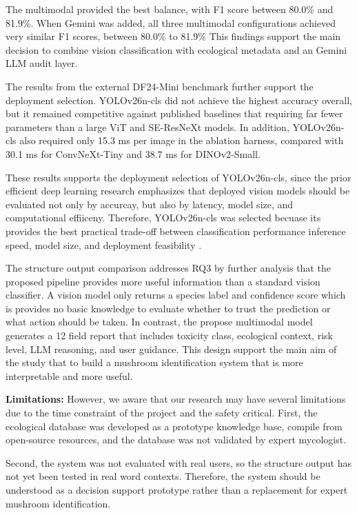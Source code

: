 \documentclass[journal,transmag]{IEEEtran}
\begin{document}
The multimodal provided the best balance, with F1 score between 80.0\% and 81.9\%. When Gemini was added, all three multimodal configurations achieved very similar F1 scores, between 80.0\% to 81.9\%  This findings support the main decision to combine vision classification with ecological metadata and an Gemini LLM audit layer.


The results from the external DF24-Mini benchmark further support the deployment selection. YOLOv26n-cls did not achieve the highest accuracy overall, but it remained competitive against published baselines that requiring far fewer parameters than a large ViT and SE-ResNeXt models. In addition, YOLOv26n-cls also required only 15.3 ms per image in the ablation harness, compared with 30.1 ms for ConvNeXt-Tiny and 38.7 ms for DINOv2-Small. 

These results supports the deployment selection of YOLOv26n-cls, since the prior efficient deep learning research emphasizes that deployed vision models should be evaluated not only by accurcay, but also by latency, model size, and computational effiiceny.  Therefore,  YOLOv26n-cls was selected becuase its provides the best practical trade-off between classification performance inference speed, model size, and deployment feasibility \cite{howard2017mobilenets}. 

The structure output comparison addresses RQ3 by further analysis that the proposed pipeline provides more useful information than a standard vision classifier. A vision model only returns a species label and confidence score which is provides no basic knowledge to evaluate whether to trust the prediction or what action should be taken. In contrast, the propose multimodal model generates a 12 field report that includes toxicity class, ecological context, risk level, LLM reasoning, and user guidance. This design support the main aim of the study that to build a mushroom identification system that is more interpretable and more useful.
 
\textbf{Limitations:} However, we aware that our research may have several limitations due to the time constraint of the project and the safety critical. First, the ecological database was developed as a prototype knowledge base, compile from open-source resources, and the database was not validated by expert mycologist. 

Second, the system was not evaluated with real users, so the structure output has not yet been tested in real word contexts. Therefore, the system should be understood as a decision support prototype rather than a replacement for expert mushroom identification. 
\end{document}
